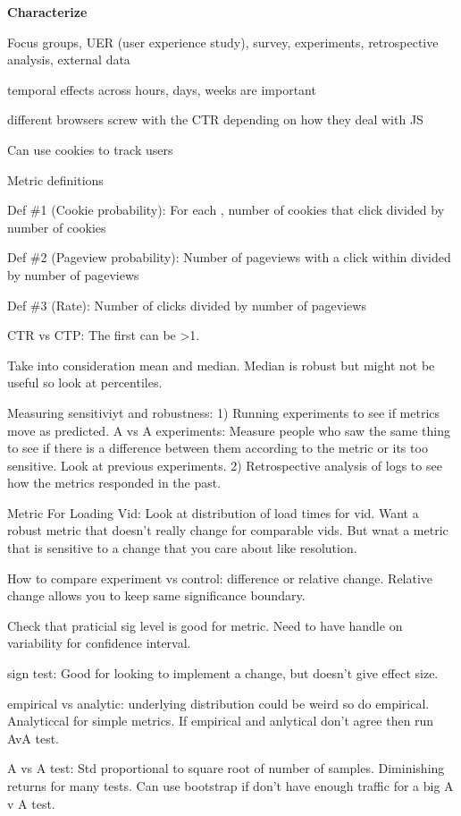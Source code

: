\documentclass[]{book}
\theoremstyle{definition}
\theoremstyle{definition}
\theoremstyle{definition}
\theoremstyle{remark}
\begin{document}
\textbf{Characterize}

Focus groups, UER (user experience study), survey, experiments,
retrospective analysis, external data

temporal effects across hours, days, weeks are important

different browsers screw with the CTR depending on how they deal with JS

Can use cookies to track users

Metric definitions

Def \#1 (Cookie probability): For each , number of cookies that click
divided by number of cookies

Def \#2 (Pageview probability): Number of pageviews with a click within
divided by number of pageviews

Def \#3 (Rate): Number of clicks divided by number of pageviews

CTR vs CTP: The first can be \textgreater{}1.

Take into consideration mean and median. Median is robust but might not
be useful so look at percentiles.

Measuring sensitiviyt and robustness: 1) Running experiments to see if
metrics move as predicted. A vs A experiments: Measure people who saw
the same thing to see if there is a difference between them according to
the metric or its too sensitive. Look at previous experiments. 2)
Retrospective analysis of logs to see how the metrics responded in the
past.

Metric For Loading Vid: Look at distribution of load times for vid. Want
a robust metric that doesn't really change for comparable vids. But wnat
a metric that is sensitive to a change that you care about like
resolution.

How to compare experiment vs control: difference or relative change.
Relative change allows you to keep same significance boundary.

Check that praticial sig level is good for metric. Need to have handle
on variability for confidence interval.

sign test: Good for looking to implement a change, but doesn't give
effect size.

empirical vs analytic: underlying distribution could be weird so do
empirical. Analyticcal for simple metrics. If empirical and anlytical
don't agree then run AvA test.

A vs A test: Std proportional to square root of number of samples.
Diminishing returns for many tests. Can use bootstrap if don't have
enough traffic for a big A v A test.
\end{document}
